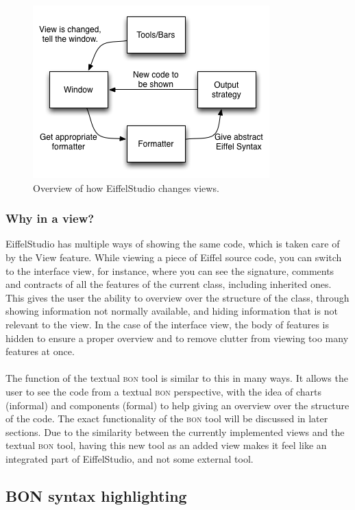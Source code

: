 \begin{figure}[H]
\centerline{
\includegraphics[scale=0.7]{images/eiffel_view_text_design.png}
}
\caption[EiffelStudio view control]{Overview of how EiffelStudio changes views.}
\label{fig:eiffelstudio_view_change}
\end{figure}

\subsubsection{Why in a view?}
\label{why_a_view}
EiffelStudio has multiple ways of showing the same code, which is taken care of by the View feature. While viewing a piece of Eiffel source code, you can switch to the interface view, for instance, where you can see the signature, comments and contracts of all the features  of the current class, including inherited ones. This gives the user the ability to overview over the structure of the class, through showing information not normally available, and hiding information that is not relevant to the view. In the case of the interface view, the body of features is hidden to ensure a proper overview and to remove clutter from viewing too many features at once.
\paragraph{}
The function of the textual \textsc{bon} tool is similar to this in many ways. It allows the user to see the code from a textual \textsc{bon} perspective, with the idea of charts (informal) and components (formal) to help giving an overview over the structure of the code. The exact functionality of the \textsc{bon} tool will be discussed in later sections. Due to the similarity between the currently implemented views and the textual \textsc{bon} tool, having this new tool as an added view makes it feel like an integrated part of EiffelStudio, and not some external tool.

\subsection{BON syntax highlighting}